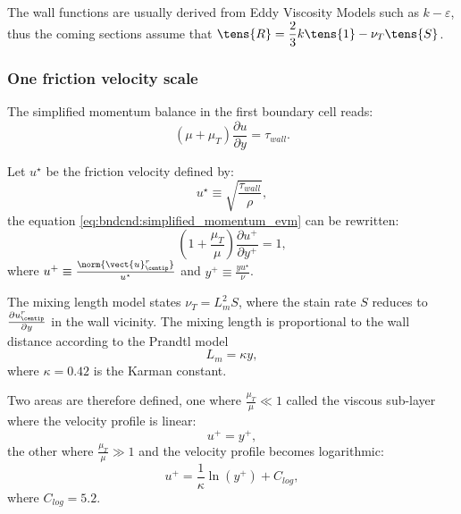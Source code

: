 The wall functions are usually derived from Eddy Viscosity Models such as $k-\varepsilon$, thus the coming sections 
assume that $\tens{R} = \dfrac{2}{3}k \tens{1} - \nu_T \tens{S}$. 


\subsubsection{One friction velocity scale}\label{sec:bndcnd:1velocityscales}

The simplified momentum balance in the first boundary cell reads:
\begin{equation}\label{eq:bndcnd:simplified_momentum_evm}
\left( \mu + \mu_T \right) \dfrac{\partial u}{\partial y} = \tau_{wall}.
\end{equation}

Let $u^\star$ be the friction velocity defined by:
\begin{equation}\label{eq:bndcnd:ustar_1scale_def}
u^\star \equiv \sqrt{ \dfrac{\tau_{wall}}{\rho}},
\end{equation}
%
the equation \eqref{eq:bndcnd:simplified_momentum_evm} can be rewritten:
%
\begin{equation}\label{eq:bndcnd:simplified_momentum_evm}
\left( 1 + \dfrac{\mu_T}{ \mu} \right) \dfrac{\partial u^+}{\partial y^+} = 1,
\end{equation}
where $u^+ \equiv \frac{\norm{ \vect{u}^r_{\centip} }}{u^\star}$ and $ y^+ \equiv \frac{y u^\star}{ \nu}$.

The mixing length model states $\nu_T = L_m^2 S $, where the stain rate $S$ reduces to $ \frac{\partial u^r_{\centip} }{\partial y} $ in the wall vicinity.
The mixing length is proportional to the wall distance according to the Prandtl model 
\begin{equation}\label{eq:bndcnd:prandtl_model}
L_m = \kappa y,
\end{equation}
where $\kappa = 0.42$ is the Karman constant.

Two areas are therefore defined, one where $ \frac{\mu_T}{\mu}  \ll 1$ called the viscous sub-layer where the velocity profile is linear:
% 
\begin{equation}\label{eq:bndcnd:linear_profile}
u^+ = y^+,
\end{equation}
%
the other where $ \frac{\mu_T}{\mu}  \gg 1$ and the velocity profile becomes logarithmic:
\begin{equation}\label{eq:bndcnd:log_profile}
u^+ = \dfrac{1}{\kappa} \ln \left( y^+\right) + C_{log},
\end{equation}
where $C_{log}=5.2$.

